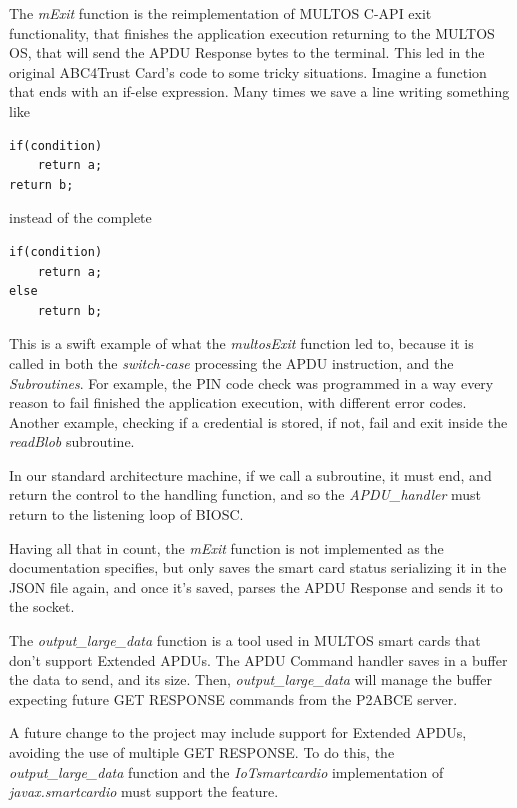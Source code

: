 The \textit{mExit} function is the reimplementation of MULTOS C-API exit functionality, that finishes the application execution returning to the MULTOS OS, that will send the APDU Response bytes to the terminal. This led in the original ABC4Trust Card's code to some tricky situations. Imagine a function that ends with an if-else expression. Many times we save a line writing something like

\begin{verbatim}
if(condition)
    return a;
return b;
\end{verbatim}

instead of the complete

\begin{verbatim}
if(condition)
    return a;
else
    return b;
\end{verbatim}

This is a swift example of what the \textit{multosExit} function led to, because it is called in both the \textit{switch-case} processing the APDU instruction, and the \textit{Subroutines}. For example, the PIN code check was programmed in a way every reason to fail finished the application execution, with different error codes. Another example, checking if a credential is stored, if not, fail and exit inside the \textit{readBlob} subroutine.

In our standard architecture machine, if we call a subroutine, it must end, and return the control to the handling function, and so the \textit{APDU\_handler} must return to the listening loop of BIOSC.

Having all that in count, the \textit{mExit} function is not implemented as the documentation specifies, but only saves the smart card status serializing it in the JSON file again, and once it's saved, parses the APDU Response and sends it to the socket.

The \textit{output\_large\_data} function is a tool used in MULTOS smart cards that don't support Extended APDUs. The APDU Command handler saves in a buffer the data to send, and its size. Then, \textit{output\_large\_data} will manage the buffer expecting future GET RESPONSE commands from the P2ABCE server.

A future change to the project may include support for Extended APDUs, avoiding the use of multiple GET RESPONSE. To do this, the \textit{output\_large\_data} function and the \textit{IoTsmartcardio} implementation of \textit{javax.smartcardio} must support the feature.



